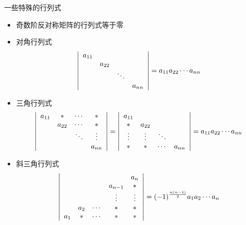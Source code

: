 \begin{frame}
  \begin{footnotesize}
    一些特殊的行列式
    \begin{itemize}
    \item 奇数阶反对称矩阵的行列式等于零
    \item 对角行列式
      $$
      \left|
      \begin{array}{cccc}
      a_{11}&&&\\
      &a_{22}&&\\
      &&\ddots&\\
      &&&a_{nn}        
      \end{array}
      \right|      
      =a_{11}a_{22}\cdots a_{nn}
      $$
    \item 三角行列式
      $$
      \left|
      \begin{array}{cccc}
      a_{11}&*&\cdots&*\\
      &a_{22}&\cdots&*\\
      &&\ddots&\vdots\\
      &&&a_{nn}        
      \end{array}
      \right|
      =\left|
      \begin{array}{cccc}
      a_{11}&&&\\
      *&a_{22}&&\\
      \vdots&\vdots&\ddots&\\
      *&*&\cdots&a_{nn}        
      \end{array}
      \right|
      =a_{11}a_{22}\cdots a_{nn}
      $$
    \item 斜三角行列式
      $$
    \left|
    \begin{array}{ccccc}
        &   & &  & a_n \\
        &   & & a_{n-1} & * \\
       &  & & \vdots & \vdots\\  
        &  a_2 & \cdots & * & * \\
      a_1 & * & \cdots & * & *
    \end{array}
    \right| = (-1)^{\frac{n(n-1)}2}
    a_1a_2\cdots a_{n}
    $$
    \end{itemize}
  \end{footnotesize}
\end{frame}


